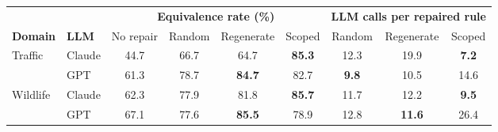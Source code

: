 \documentclass[border=8pt,12pt]{standalone}
\begin{document}
\renewcommand{\arraystretch}{1.35}
\begin{tabular}{@{}llcccc@{\hskip 18pt}ccc@{}}
\toprule
& & \multicolumn{4}{c}{\textbf{Equivalence rate (\%)}} & \multicolumn{3}{c}{\textbf{LLM calls per repaired rule}} \\
\cmidrule(lr){3-6} \cmidrule(l){7-9}
\textbf{Domain} & \textbf{LLM} & No repair & Random & Regenerate & Scoped & Random & Regenerate & Scoped \\
\midrule
\multirow{2}{*}{Traffic}  & Claude & 44.7 & 66.7 & 64.7 & \textbf{85.3} & 12.3 & 19.9 & \textbf{7.2} \\
                          & GPT    & 61.3 & 78.7 & \textbf{84.7} & 82.7 & \textbf{9.8} & 10.5 & 14.6 \\
\midrule
\multirow{2}{*}{Wildlife} & Claude & 62.3 & 77.9 & 81.8 & \textbf{85.7} & 11.7 & 12.2 & \textbf{9.5} \\
                          & GPT    & 67.1 & 77.6 & \textbf{85.5} & 78.9 & 12.8 & \textbf{11.6} & 26.4 \\
\bottomrule
\end{tabular}
\end{document}
